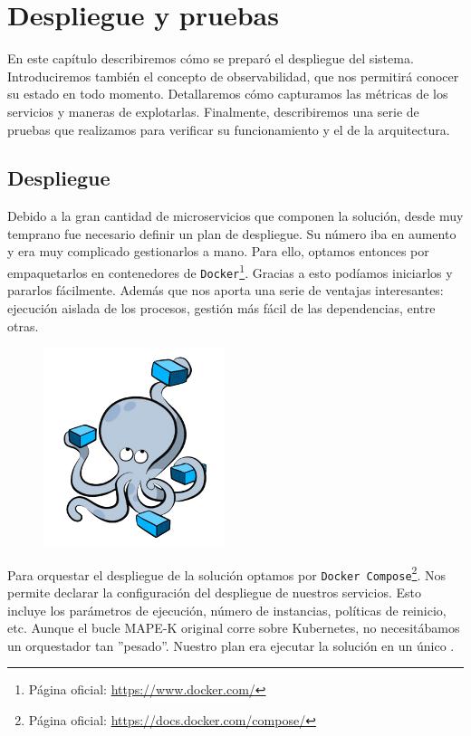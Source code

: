 \chapter{Despliegue y pruebas}
\label{chap:despliegue}

En este capítulo describiremos cómo se preparó el despliegue del sistema. Introduciremos también el concepto de observabilidad, que nos permitirá conocer su estado en todo momento. Detallaremos cómo capturamos las métricas de los servicios y maneras de explotarlas. Finalmente, describiremos una serie de pruebas que realizamos para verificar su funcionamiento y el de la arquitectura.

\section{Despliegue}

Debido a la gran cantidad de microservicios que componen la solución, desde muy temprano fue necesario definir un plan de despliegue. Su número iba en aumento y era muy complicado gestionarlos a mano. Para ello, optamos entonces por empaquetarlos en contenedores de \texttt{Docker}\footnote{Página oficial: \url{https://www.docker.com/}}. Gracias a esto podíamos iniciarlos y pararlos fácilmente. Además que nos aporta una serie de ventajas interesantes: ejecución aislada de los procesos, gestión más fácil de las dependencias, entre otras. \cite{newmanBuildingMicroservicesDesigning2021,delatorreNETMicroservicesArchitecture2021}

\begin{figure}
  \vspace{-25pt}
  \centering
  \includegraphics[scale=0.95]{cap_despliegue/images/docker-compose-logo}
  \vspace{-15pt}
\end{figure}

Para orquestar el despliegue de la solución optamos por \texttt{Docker Compose}\footnote{Página oficial: \url{https://docs.docker.com/compose/}}. Nos permite declarar la configuración del despliegue de nuestros servicios. Esto incluye los parámetros de ejecución, número de instancias, políticas de reinicio, etc. Aunque el bucle MAPE-K  original corre sobre Kubernetes, no necesitábamos un orquestador tan ''pesado''. Nuestro plan era ejecutar la solución en un único .

